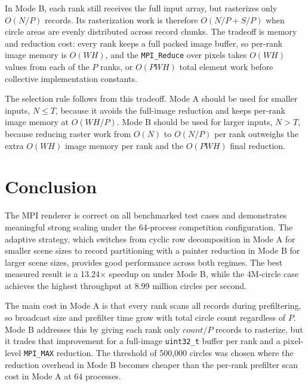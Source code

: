 \documentclass{article}
\begin{document}
In Mode B, each rank still receives the full input array, but rasterizes only \(O(N/P)\) records. Its rasterization work is therefore \(O(N/P + S/P)\) when circle areas are evenly distributed across record chunks. The tradeoff is memory and reduction cost: every rank keeps a full packed image buffer, so per-rank image memory is \(O(WH)\), and the \texttt{MPI\_Reduce} over pixels takes \(O(WH)\) values from each of the \(P\) ranks, or \(O(PWH)\) total element work before collective implementation constants.

The selection rule follows from this tradeoff. Mode A should be used for smaller inputs, \(N \le T\), because it avoids the full-image reduction and keeps per-rank image memory at \(O(WH/P)\). Mode B should be used for larger inputs, \(N > T\), because reducing raster work from \(O(N)\) to \(O(N/P)\) per rank outweighs the extra \(O(WH)\) image memory per rank and the \(O(PWH)\) final reduction.

\section{Conclusion}
The MPI renderer is correct on all benchmarked test cases and demonstrates meaningful strong scaling under the 64-process competition configuration. The adaptive strategy, which switches from cyclic row decomposition in Mode A for smaller scene sizes to record partitioning with a painter reduction in Mode B for larger scene sizes, provides good performance across both regimes. The best measured result is a 13.24\(\times\) speedup on  under Mode B, while the 4M-circle case achieves the highest throughput at 8.99 million circles per second.

The main cost in Mode A is that every rank scans all records during prefiltering, so broadcast size and prefilter time grow with total circle count regardless of \(P\). Mode B addresses this by giving each rank only \(count/P\) records to rasterize, but it trades that improvement for a full-image \texttt{uint32\_t} buffer per rank and a pixel-level \texttt{MPI\_MAX} reduction. The threshold of 500,000 circles was chosen where the reduction overhead in Mode B becomes cheaper than the per-rank prefilter scan cost in Mode A at 64 processes.
\end{document}
